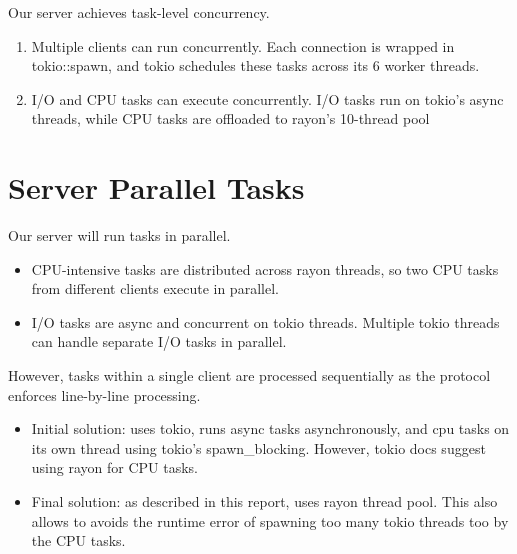 \documentclass[11pt]{article}
\begin{document}
Our server achieves task-level concurrency.
\begin{enumerate}
    \item Multiple clients can run concurrently. Each connection is wrapped in tokio::spawn, and tokio schedules these tasks across its 6 worker threads. 
    \item I/O and CPU tasks can execute concurrently. I/O tasks run on tokio's async threads, while CPU tasks are offloaded to rayon's 10-thread pool
\end{enumerate}

\section{Server Parallel Tasks}

Our server will run tasks in parallel.
\begin{itemize}
    \item CPU-intensive tasks are distributed across rayon threads, so two CPU tasks from different clients execute in parallel.
    \item I/O tasks are async and concurrent on tokio threads. Multiple tokio threads can handle separate I/O tasks in parallel.
\end{itemize}
However, tasks within a single client are processed sequentially as the protocol enforces line-by-line processing.

\begin{itemize}
    \item Initial solution: uses tokio, runs async tasks asynchronously, and cpu tasks on its own thread using tokio's spawn_blocking. However, tokio docs suggest using rayon for CPU tasks.
    \item Final solution: as described in this report, uses rayon thread pool. This also allows to avoids the runtime error of spawning too many tokio threads too by the CPU tasks.
\end{itemize}
\end{document}
